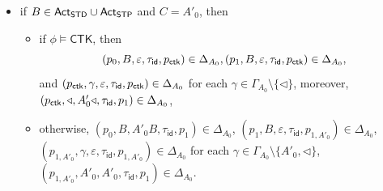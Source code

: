 \documentclass[preprint,12pt]{elsarticle}
\newcommand\act{{\sf Act}}
\newcommand\standard{{\sf STD}}
\newcommand\singletop{{\sf STP}}
\newcommand{\CTK}{\mathsf{CTK}}
\newcommand{\id}{\mathsf{id}}
\begin{document}
\begin{itemize}
\begin{itemize}
\begin{itemize}
				\item if $B \in \act_\standard \cup \act_\singletop$ and $C = A'_0$,  then 
				\begin{itemize}
					\item if $\phi \models \CTK$, then 
					$$(p_0, B, \varepsilon, \tau_{\id}, p_{\sf ctk}) \in \Delta_{A_0}, (p_1, B, \varepsilon, \tau_{\id}, p_{\sf ctk}) \in \Delta_{A_0},$$ 
					and $(p_{\sf ctk}, \gamma, \varepsilon, \tau_\id, p_{\sf ctk}) \in \Delta_{A_0}$ 
					for each $\gamma \in \Gamma_{A_0} \setminus \{\triangleleft\}$, moreover, $(p_{\sf ctk}, \triangleleft, A'_0 \triangleleft, \tau_\id, p_1) \in \Delta_{A_0}$, 
					\item otherwise, $(p_0, B, A'_0 B, \tau_{\id}, p_1) \in \Delta_{A_0}$, $(p_1, B, \varepsilon, \tau_{\id}, p_{1, A'_0}) \in \Delta_{A_0}$, $(p_{1, A'_0}, \gamma, \varepsilon, \tau_{\id}, p_{1, A'_0}) \in \Delta_{A_0}$ for each $\gamma \in \Gamma_{A_0} \setminus \{A'_0, \triangleleft\}$,  $(p_{1, A'_0}, A'_0, A'_0, \tau_{\id}, p_1) \in \Delta_{A_0}$.  
				\end{itemize}				
            \end{itemize}
        \end{itemize}
\end{itemize}
\end{document}
